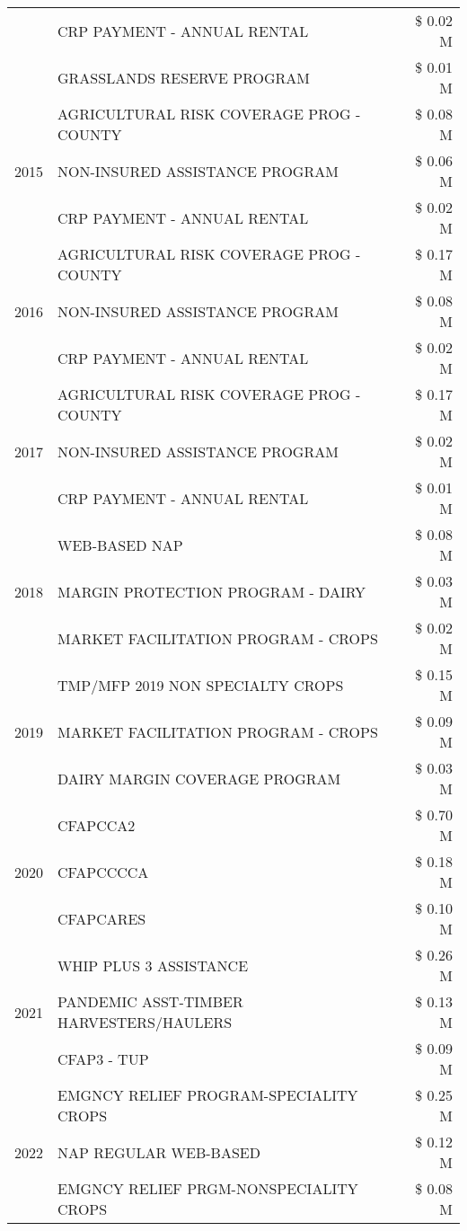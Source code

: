 \begin{tabular}{llr}
 & CRP PAYMENT - ANNUAL RENTAL & \$ 0.02 M \\
 & GRASSLANDS RESERVE PROGRAM & \$ 0.01 M \\
\cline{1-3}
\multirow[t]{3}{*}{2015} & AGRICULTURAL RISK COVERAGE PROG - COUNTY & \$ 0.08 M \\
 & NON-INSURED ASSISTANCE PROGRAM & \$ 0.06 M \\
 & CRP PAYMENT - ANNUAL RENTAL & \$ 0.02 M \\
\cline{1-3}
\multirow[t]{3}{*}{2016} & AGRICULTURAL RISK COVERAGE PROG - COUNTY & \$ 0.17 M \\
 & NON-INSURED ASSISTANCE PROGRAM & \$ 0.08 M \\
 & CRP PAYMENT - ANNUAL RENTAL & \$ 0.02 M \\
\cline{1-3}
\multirow[t]{3}{*}{2017} & AGRICULTURAL RISK COVERAGE PROG - COUNTY & \$ 0.17 M \\
 & NON-INSURED ASSISTANCE PROGRAM & \$ 0.02 M \\
 & CRP PAYMENT - ANNUAL RENTAL & \$ 0.01 M \\
\cline{1-3}
\multirow[t]{3}{*}{2018} & WEB-BASED NAP & \$ 0.08 M \\
 & MARGIN PROTECTION PROGRAM - DAIRY & \$ 0.03 M \\
 & MARKET FACILITATION PROGRAM - CROPS & \$ 0.02 M \\
\cline{1-3}
\multirow[t]{3}{*}{2019} & TMP/MFP 2019 NON SPECIALTY CROPS & \$ 0.15 M \\
 & MARKET FACILITATION PROGRAM - CROPS & \$ 0.09 M \\
 & DAIRY MARGIN COVERAGE PROGRAM & \$ 0.03 M \\
\cline{1-3}
\multirow[t]{3}{*}{2020} & CFAPCCA2 & \$ 0.70 M \\
 & CFAPCCCCA & \$ 0.18 M \\
 & CFAPCARES & \$ 0.10 M \\
\cline{1-3}
\multirow[t]{3}{*}{2021} & WHIP PLUS 3 ASSISTANCE & \$ 0.26 M \\
 & PANDEMIC ASST-TIMBER HARVESTERS/HAULERS & \$ 0.13 M \\
 & CFAP3 - TUP & \$ 0.09 M \\
\cline{1-3}
\multirow[t]{3}{*}{2022} & EMGNCY RELIEF PROGRAM-SPECIALITY CROPS & \$ 0.25 M \\
 & NAP REGULAR WEB-BASED & \$ 0.12 M \\
 & EMGNCY RELIEF PRGM-NONSPECIALITY CROPS & \$ 0.08 M \\
\cline{1-3}
\bottomrule
\end{tabular}
